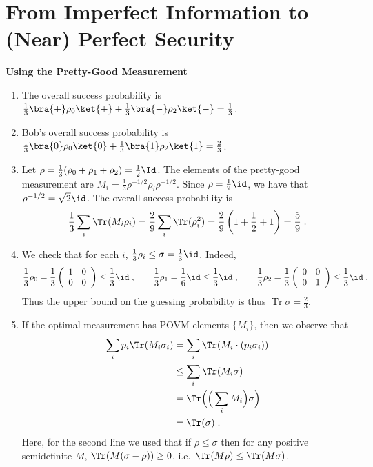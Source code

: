 
\chapter{From Imperfect Information to (Near) Perfect Security}

\begin{exercises}


\item {\bf Using the Pretty-Good Measurement}

\begin{enumerate}
\item The overall success probability is $\frac13 \bra{+} \rho _0 \ket{+}  + \frac13 \bra{-} \rho _2 \ket{-}  = \frac13$.

\item Bob's overall success probability is $\frac13\bra{0} \rho _0 \ket{0}  + \frac13\bra{1} \rho_2 \ket{1}  = \frac23$.

\item Let $\rho=\frac{1}{3}(\rho_0+\rho_1+\rho_2) = \frac{1}{2}\Id$. The elements of the pretty-good measurement are $M_ i = \frac13\rho ^{-1/2}\rho_i\rho ^{-1/2}$. Since $\rho = \frac{1}{2}\id$, we have that $\rho ^{-1/2} = \sqrt{2}\id$. The overall success probability is 
\[ \frac{1}{3}\sum_i \Tr(M_i\rho_i) = \frac{2}{9} \sum_i \Tr(\rho _ i^2) = \frac{2}{9}\left(1 + \frac{1}{2} + 1\right) = \frac{5}{9}\;.\]

\item We check that for each $i$, $\frac13 \rho _ i \leq \sigma = \frac13\id$. Indeed,
\[\frac13\rho _0 = \frac13\left( \begin{array}{cc}1&  0 \\ 0 & 0 \end{array} \right) \leq \frac13\id\;,\qquad \frac13\rho _1 =\frac16\id\leq \frac13\id\;,\qquad
\frac13\rho _2 = \frac13\left( \begin{array}{cc}0&  0 \\ 0 & 1 \end{array} \right) \leq \frac13\id\;.\]
Thus the upper bound on the guessing probability is thus $\operatorname {Tr}\sigma = \frac23$.

\item If the optimal measurement has POVM elements $\{M_i\}$, then we observe that 
\begin{align*}
\sum_i p_i  \Tr(M_i \sigma_i) &= \sum_i  \Tr( M_i \cdot (p_i\sigma_i))\\
&\leq \sum_i \Tr(M_i\sigma)\\
&= \Tr\Big(\Big(\sum_i M_i\Big)\sigma\Big)\\
&= \Tr(\sigma)\;.
\end{align*}
Here, for the second line we used that if $\rho\leq \sigma$ then for any positive semidefinite $M$, $\Tr(M(\sigma-\rho))\geq 0$, i.e.\ $\Tr(M\rho)\leq \Tr(M\sigma)$. 
\end{enumerate}



\end{exercises}
